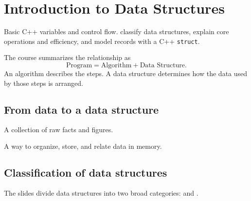 \chapter{Introduction to Data Structures}\label{ch:introduction}

\chapterguide%
  {Basic C++ variables and control flow.}
  {classify data structures, explain core operations and efficiency, and model records with a C++ \texttt{struct}.}

\begin{keyidea}
The course summarizes the relationship as
\[
\text{Program} = \text{Algorithm} + \text{Data Structure}.
\]
An algorithm describes the steps. A data structure determines how the data used by those steps is arranged.
\end{keyidea}

\section{From data to a data structure}

\begin{description}[leftmargin=1.4in,style=nextline]
  \item[Data] A collection of raw facts and figures.
  \item[Data structure] A way to organize, store, and relate data in memory.
\end{description}

\section{Classification of data structures}

The slides divide data structures into two broad categories:  and .

